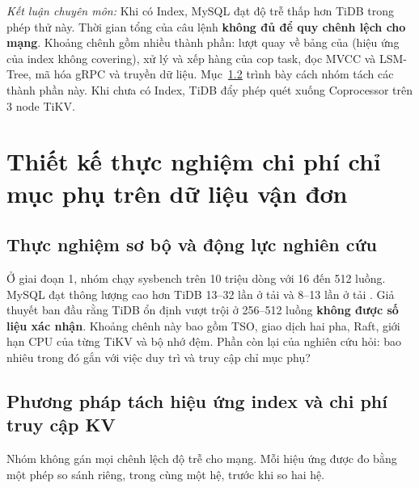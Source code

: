 \textit{Kết luận chuyên môn:}
Khi có Index, MySQL đạt độ trễ thấp hơn TiDB trong phép thử này. Thời gian tổng của câu lệnh \textbf{không đủ để quy chênh lệch cho mạng}. Khoảng chênh gồm nhiều thành phần: lượt quay về bảng của  (hiệu ứng của index không covering), xử lý và xếp hàng của cop task, đọc MVCC và LSM-Tree, mã hóa gRPC và truyền dữ liệu. Mục~\ref{sec:phuong_phap_tach_chi_phi} trình bày cách nhóm tách các thành phần này. Khi chưa có Index, TiDB đẩy phép quét xuống Coprocessor trên 3 node TiKV.

\section{Thiết kế thực nghiệm chi phí chỉ mục phụ trên dữ liệu vận đơn}
\label{sec:phan_b_thuc_nghiem_doi_chung}

\subsection{Thực nghiệm sơ bộ và động lực nghiên cứu}

Ở giai đoạn 1, nhóm chạy sysbench trên  10 triệu dòng với 16 đến 512 luồng. MySQL đạt thông lượng cao hơn TiDB 13--32 lần ở tải  và 8--13 lần ở tải . Giả thuyết ban đầu rằng TiDB ổn định vượt trội ở 256--512 luồng \textbf{không được số liệu xác nhận}. Khoảng chênh này bao gồm TSO, giao dịch hai pha, Raft, giới hạn CPU của từng TiKV và bộ nhớ đệm. Phần còn lại của nghiên cứu hỏi: bao nhiêu trong đó gắn với việc duy trì và truy cập chỉ mục phụ?

\subsection{Phương pháp tách hiệu ứng index và chi phí truy cập KV}
\label{sec:phuong_phap_tach_chi_phi}

Nhóm không gán mọi chênh lệch độ trễ cho mạng. Mỗi hiệu ứng được đo bằng một phép so sánh riêng, trong cùng một hệ, trước khi so hai hệ.

